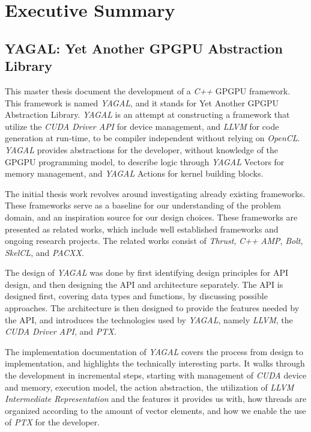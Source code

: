 


\chapter*{Executive Summary}
\section*{YAGAL: Yet Another GPGPU Abstraction Library}
This master thesis document the development of a \textit{C++} GPGPU framework. This framework is named \textit{YAGAL}, and it stands for Yet Another GPGPU Abstraction Library. \textit{YAGAL} is an attempt at constructing a framework that utilize the \textit{CUDA Driver API} for device management, and \textit{LLVM} for code generation at run-time, to be compiler independent without relying on \textit{OpenCL}. \textit{YAGAL} provides abstractions for the developer, without knowledge of the GPGPU programming model, to describe logic through \textit{YAGAL} Vectors for memory management, and \textit{YAGAL} Actions for kernel building blocks.

The initial thesis work revolves around investigating already existing frameworks. These frameworks serve as a baseline for our understanding of the problem domain, and an inspiration source for our design choices. These frameworks are presented as related works, which include well established frameworks and ongoing research projects. The related works consist of \textit{Thrust}, \textit{C++} \textit{AMP}, \textit{Bolt}, \textit{SkelCL}, and \textit{PACXX}. 

The design of \textit{YAGAL} was done by first identifying design principles for API design, and then designing the API and architecture separately. The API is designed first, covering data types and functions, by discussing possible approaches. The architecture is then designed to provide the features needed by the API, and introduces the technologies used by \textit{YAGAL}, namely \textit{LLVM}, the \textit{CUDA Driver API}, and \textit{PTX}.

The implementation documentation of \textit{YAGAL} covers the process from design to implementation, and highlights the technically interesting parts. It walks through the development in incremental steps, starting with management of \textit{CUDA} device and memory, execution model, the action abstraction, the utilization of \textit{LLVM Intermediate Representation} and the features it provides us with, how threads are organized according to the amount of vector elements, and how we enable the use of \textit{PTX} for the developer. 

